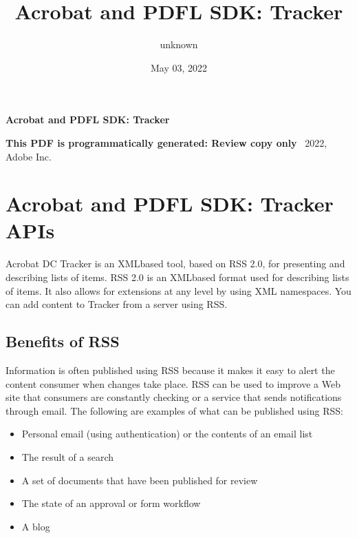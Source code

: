 \documentclass[letterpaper,12pt,english,openany,oneside]{sphinxmanual}
\title{Acrobat and PDFL SDK: Tracker}
\date{May 03, 2022}
\author{unknown}
\begin{document}
\pagestyle{empty}

    \begin{titlepage}
        \begin{figure}[h]
        \end{figure}
        \centering
        \vspace*{40mm}
        \textbf{\Huge Acrobat and PDFL SDK: Tracker}

        \vspace{15mm}
        \Large \textbf{{This PDF is programmatically generated: Review copy only}}
        \vfill
        \small \textcopyright\ 2022, Adobe Inc.
    \end{titlepage}
    \clearpage
    \tableofcontents
    \clearpage
    
\pagestyle{plain}

\pagestyle{normal}
\label{\detokenize{toc::doc}}



\chapter{Acrobat and PDFL SDK: Tracker APIs}
\label{\detokenize{index:acrobat-and-pdfl-sdk-tracker-apis}}\label{\detokenize{index::doc}}
Acrobat DC Tracker is an XML\sphinxhyphen{}based tool, based on RSS 2.0, for presenting and describing lists of items. RSS 2.0 is an XML\sphinxhyphen{}based format used for describing lists of items. It also allows for extensions at any level by using XML namespaces. You can add content to Tracker from a server using RSS.


\section{Benefits of RSS}
\label{\detokenize{index:benefits-of-rss}}
Information is often published using RSS because it makes it easy to alert the content consumer when changes take place. RSS can be used to improve a Web site that consumers are constantly checking or a service that sends notifications through email. The following are examples of what can be published using RSS:
\begin{itemize}
\item {} 
Personal email (using authentication) or the contents of an email list

\item {} 
The result of a search

\item {} 
A set of documents that have been published for review

\item {} 
The state of an approval or form workflow

\item {} 
A blog

\end{itemize}
\end{document}
